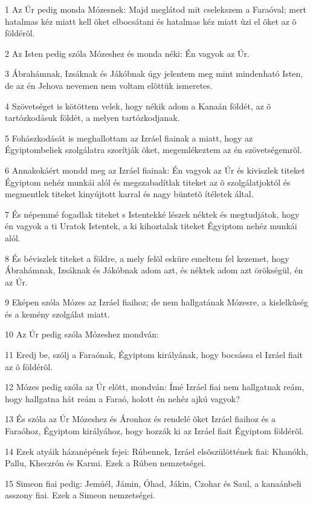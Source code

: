 \par 1 Az Úr pedig monda Mózesnek: Majd meglátod mit cselekszem a Faraóval; mert hatalmas kéz miatt kell õket elbocsátani és hatalmas kéz miatt ûzi el õket az õ földérõl.
\par 2 Az Isten pedig szóla Mózeshez és monda néki: Én vagyok az Úr.
\par 3 Ábrahámnak, Izsáknak és Jákóbnak úgy jelentem meg mint mindenható Isten, de az én Jehova  nevemen nem voltam elõttük ismeretes.
\par 4 Szövetséget is kötöttem velek, hogy nékik adom a Kanaán földét, az õ tartózkodásuk földét, a melyen tartózkodjanak.
\par 5 Fohászkodását is meghallottam az Izráel fiainak a miatt, hogy az Égyiptombeliek szolgálatra szorítják õket, megemlékeztem az én szövetségemrõl.
\par 6 Annakokáért mondd meg az Izráel fiainak: Én vagyok az Úr és kiviszlek titeket Égyiptom nehéz munkái alól és megszabadítlak titeket az õ szolgálatjoktól és megmentlek titeket kinyújtott karral és nagy büntetõ ítéletek által.
\par 7 És népemmé fogadlak titeket s Istentekké lészek néktek és megtudjátok, hogy én vagyok a ti Uratok Istentek, a ki kihoztalak titeket Égyiptom nehéz munkái alól.
\par 8 És béviszlek titeket a földre, a mely felõl esküre emeltem fel kezemet, hogy Ábrahámnak, Izsáknak és Jákóbnak adom azt, és néktek adom azt örökségül, én az Úr.
\par 9 Eképen szóla Mózes az Izráel fiaihoz; de nem hallgatának Mózesre, a kislelkûség és a kemény szolgálat miatt.
\par 10 Az Úr pedig szóla Mózeshez mondván:
\par 11 Eredj be, szólj a Faraónak, Égyiptom királyának, hogy bocsássa el Izráel fiait az õ földérõl.
\par 12 Mózes pedig szóla az Úr elõtt, mondván: Ímé Izráel fiai nem hallgatnak reám, hogy hallgatna hát reám a Faraó, holott én nehéz ajkú vagyok?
\par 13 És szóla az Úr Mózeshez és Áronhoz és rendelé õket Izráel fiaihoz és a Faraóhoz, Égyiptom királyához, hogy hozzák ki az Izráel fiait Égyiptom földérõl.
\par 14 Ezek atyáik házanépének fejei: Rúbennek, Izráel elsõszülöttének fiai: Khanókh, Pallu, Kheczrón és Karmi. Ezek a Rúben nemzetségei.
\par 15 Simeon fiai pedig: Jemúél, Jámin, Óhad, Jákin, Czohar és Saul, a kanaánbeli asszony fiai. Ezek a Simeon nemzetségei.
